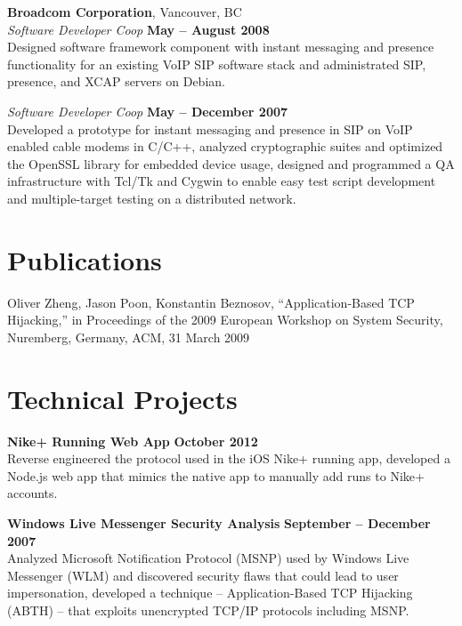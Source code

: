 \documentclass[margin,line]{resume}
\begin{document}
\begin{resume}
	\textbf{Broadcom Corporation}, Vancouver, BC \vspace{2mm}\\\vspace{1mm}%
	\textsl{Software Developer Coop} \hfill
	\textbf{May -- August 2008}\\
	Designed software framework component with instant messaging and presence
	functionality for an existing VoIP SIP software stack and administrated SIP,
	presence, and XCAP servers on Debian.

	\textsl{Software Developer Coop} \hfill
	\textbf{May -- December 2007}\\
	Developed a prototype for instant messaging and presence in SIP on VoIP
	enabled cable modems in C/C++, analyzed cryptographic suites and
	optimized the OpenSSL library for embedded device usage, designed and
	programmed a QA infrastructure with Tcl/Tk and Cygwin to enable easy test
	script development and multiple-target testing on a distributed network.

	\section{\mysidestyle Publications}

	Oliver Zheng, Jason Poon, Konstantin Beznosov, ``Application-Based TCP
	Hijacking,'' in Proceedings of the 2009 European Workshop on System
	Security, Nuremberg, Germany, ACM, 31 March 2009

	\section{\mysidestyle Technical Projects}
	\textbf{Nike+ Running Web App} \hfill
	\textbf{October 2012} \vspace{2mm}\\\vspace{1mm}%
	Reverse engineered the protocol used in the iOS Nike+ running app, developed
	a Node.js web app that mimics the native app to manually add runs to Nike+
	accounts.

	\textbf{Windows Live Messenger Security Analysis} \hfill
	\textbf{September -- December 2007} \vspace{2mm}\\\vspace{1mm}%
	Analyzed Microsoft Notification Protocol (MSNP) used by Windows Live
	Messenger (WLM) and discovered security flaws that could lead to user
	impersonation, developed a technique -- Application-Based TCP Hijacking
	(ABTH) -- that exploits unencrypted TCP/IP protocols including MSNP.


\end{resume}
\end{document}
